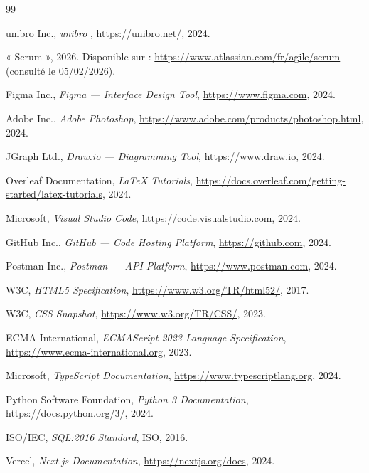 

\begin{thebibliography}{99}

unibro Inc., \textit{unibro }, \url{https://unibro.net/}, 2024.

« Scrum », 2026. Disponible sur : \url{https://www.atlassian.com/fr/agile/scrum} (consulté le 05/02/2026).

Figma Inc., \textit{Figma — Interface Design Tool}, \url{https://www.figma.com}, 2024.

Adobe Inc., \textit{Adobe Photoshop}, \url{https://www.adobe.com/products/photoshop.html}, 2024.

JGraph Ltd., \textit{Draw.io — Diagramming Tool}, \url{https://www.draw.io}, 2024.

Overleaf Documentation, \textit{LaTeX Tutorials}, \url{https://docs.overleaf.com/getting-started/latex-tutorials}, 2024.

Microsoft, \textit{Visual Studio Code}, \url{https://code.visualstudio.com}, 2024.

GitHub Inc., \textit{GitHub — Code Hosting Platform}, \url{https://github.com}, 2024.

Postman Inc., \textit{Postman — API Platform}, \url{https://www.postman.com}, 2024.

W3C, \textit{HTML5 Specification}, \url{https://www.w3.org/TR/html52/}, 2017.

W3C, \textit{CSS Snapshot}, \url{https://www.w3.org/TR/CSS/}, 2023.

ECMA International, \textit{ECMAScript 2023 Language Specification}, \url{https://www.ecma-international.org}, 2023.

Microsoft, \textit{TypeScript Documentation}, \url{https://www.typescriptlang.org}, 2024.

Python Software Foundation, \textit{Python 3 Documentation}, \url{https://docs.python.org/3/}, 2024.

ISO/IEC, \textit{SQL:2016 Standard}, ISO, 2016.

Vercel, \textit{Next.js Documentation}, \url{https://nextjs.org/docs}, 2024.


\end{thebibliography}
